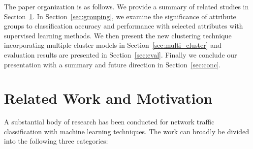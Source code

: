 \documentclass[conference]{IEEEtran}
\begin{document}
The paper organization is as follows. We provide a summary of related studies
in Section~\ref{sec:related}.
In Section~\ref{sec:grouping}, we examine the significance of attribute groups to classification accuracy and performance with selected attributes with supervised learning methods.
We then present the new clustering technique incorporating multiple cluster models in Section~\ref{sec:multi_cluster} and evaluation results are presented in Section~\ref{sec:eval}.
Finally we conclude our presentation with a summary and future direction in Section~\ref{sec:conc}.

\section{Related Work and Motivation}
\label{sec:related}
%
%

A substantial body of research has been conducted for network traffic classification with machine learning techniques.
The work can broadly be divided into the following three categories:
\end{document}
